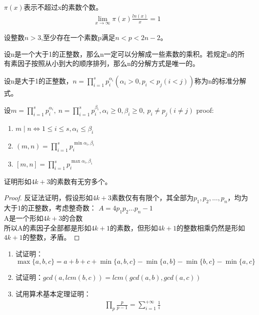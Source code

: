 \documentclass[cn,10pt]{elegantbook}
\begin{document}
\begin{theorem}[素数定理]
  $\pi (x)$表示不超过x的素数个数。
  \begin{align*}
    \lim_{x \rightarrow \infty} \pi (x) \frac{ln(x)}{x} = 1
  \end{align*}
\end{theorem}
\begin{theorem}
  设整数$n>3$,至少存在一个素数p满足$n<p<2n-2$。
\end{theorem}
\begin{theorem}[算术基本定理]
  设n是一个大于1的正整数，那么n一定可以分解成一些素数的乘积。若规定n的所有素因子按照从小到大的顺序排列，那么n的分解方式是唯一的。
\end{theorem}
\begin{definition}
  设n是大于1的正整数，$n = \prod_{i=1}^{s} p_i^{\alpha_i}(\alpha_i>0,p_i<p_j(i<j))$称为n的标准分解式。
\end{definition}

\begin{example}
  设$m = \prod_{i=1}^{s}p_i^{\alpha_i},\ n = \prod_{i=1}^{s}p_i^{\beta_i},\alpha_i \geq 0 , \beta_i \geq 0, \ p_i \neq p_j(i \neq j)$ proof:\\
  \begin{enumerate}[(1)]
    \item $m \mid n \Leftrightarrow 1 \leq i \leq s , \alpha_i \leq \beta_i$\\
    \item $(m,n) = \prod_{i=1}^{s}p_i^{\min{\alpha_i,\beta_i}}$\\
    \item $[m,n] = \prod_{i=1}^{s}p_i^{\max{\alpha_i,\beta_i}}$\\
  \end{enumerate}
\end{example}
\begin{exercise}
  证明形如$4k+3$的素数有无穷多个。
\end{exercise}
\begin{proof}
  反证法证明，假设形如$4k+3$素数仅有有限个，其全部为$p_1,p_2, \dots ,p_n$，均为大于1的正整数，考虑整奇数：
  $A = 4p_1p_2 \dots p_n -1$\\
  A是一个形如$4k+3$的合数\\
  所以A的素因子全部都是形如$4k+1$的素数，但形如$4k+1$的整数相乘仍然是形如$4k+1$的整数，矛盾。
\end{proof}
\begin{exercise}
  \begin{enumerate}
    \item 试证明：$\max\{a,b,c\} = a+b+c+ \min \{a,b,c\}-\min \{a,b\} - \min \{b,c\} - \min \{a,c\}$
    \item 试证明：$gcd(a,lcm(b,c))=lcm(gcd(a,b),gcd(a,c))$
    \item 试用算术基本定理证明：
    \begin{align*}
      \prod_{p} \frac{p}{p-1} = \sum_{i=1}^{+ \infty} \frac{1}{i}
    \end{align*}
  \end{enumerate}
\end{exercise}
\end{document}
